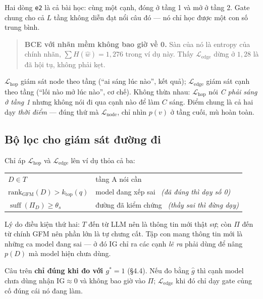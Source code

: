 \documentclass[11pt,a4paper]{article}
\DeclareMathOperator{\suff}{suff}
\begin{document}
Hai dòng \texttt{e2} là cả bài học: cùng một cạnh, đóng ở tầng 1 và mở ở tầng 2. Gate chung
cho cả $L$ tầng không diễn đạt nổi câu đó --- nó chỉ học được một con số trung bình.

\begin{quote}
\textbf{BCE với nhãn mềm không bao giờ về 0.} Sàn của nó là entropy của chính nhãn,
$\sum H(\widehat w)=1{,}276$ trong ví dụ này. Thấy $\mathcal{L}_{\text{edge}}$ dừng ở
$1{,}28$ là đã hội tụ, không phải kẹt.
\end{quote}

$\mathcal{L}_{\text{hop}}$ giám sát node theo tầng (``ai sáng lúc nào'', kết quả);
$\mathcal{L}_{\text{edge}}$ giám sát cạnh theo tầng (``lối nào mở lúc nào'', cơ chế). Không
thừa nhau: $\mathcal{L}_{\text{hop}}$ nói \emph{C phải sáng ở tầng 1} nhưng không nói đi qua
cạnh nào để làm $C$ sáng. Điểm chung là cả hai dạy \emph{thời điểm} --- đúng thứ mà
$\mathcal{L}_{\text{node}}$, chỉ nhìn $p(v)$ ở tầng cuối, mù hoàn toàn.

\subsection{Bộ lọc cho giám sát đường đi}

Chỉ áp $\mathcal{L}_{\text{hop}}$ và $\mathcal{L}_{\text{edge}}$ lên ví dụ thỏa cả ba:

\begin{center}
\begin{tabular}{@{}ll@{}}
\toprule
$D\in T$ & tầng A nói cần \\
$\mathrm{rank}_{\text{GFM}}(D)>k_{\text{top}}(q)$ & model đang xếp sai \ \emph{(đã đúng thì dạy số 0)} \\
$\suff(\Pi_D)\ge\theta_s$ & đường đã kiểm chứng \ \emph{(thầy sai thì đừng dạy)} \\
\bottomrule
\end{tabular}
\end{center}

Lý do điều kiện thứ hai: $T$ đến từ LLM nên là thông tin mới thật sự; còn $\Pi$ đến từ chính GFM nên phần lớn là tự chưng cất. Tập con mang thông tin mới là những ca model đang sai --- ở đó IG chỉ ra các cạnh \emph{lẽ ra} phải dùng để nâng $p(D)$ mà model hiện chưa dùng.

Câu trên \textbf{chỉ đúng khi đo với $g^\ast=1$} (\S4.4). Nếu đo bằng $\hat g$ thì cạnh
model chưa dùng nhận $\mathrm{IG}\approx 0$ và không bao giờ vào $\Pi$;
$\mathcal{L}_{\text{edge}}$ khi đó chỉ dạy gate củng cố đúng cái nó đang làm.
\end{document}
